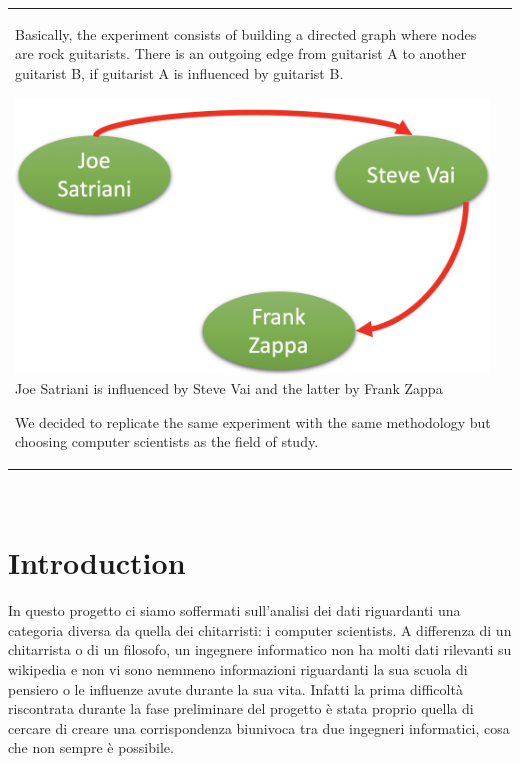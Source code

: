 \documentclass[12pt, twoside]{article}
\begin{document}
\begin{titlepage}
\begin{tabular}{p{6cm} p{10cm}}
Basically, the experiment consists of building a directed graph where nodes are rock guitarists. There is an outgoing edge from guitarist A to another guitarist B, if guitarist A is influenced by guitarist B.
\begin{center}
\includegraphics[scale=0.22]{images/guitar_influences}	
\linebreak
\scriptsize Joe Satriani is influenced by Steve Vai and the latter by Frank Zappa
\end{center}
We decided to replicate the same experiment with the same methodology but choosing computer scientists as the field of study.

\end{tabular}
\end{titlepage}

\tableofcontents
$\ $

\newpage
\section{Introduction}
In questo progetto ci siamo soffermati sull'analisi dei dati riguardanti una categoria diversa da quella dei chitarristi: i computer scientists. A differenza di un chitarrista o di un filosofo, un ingegnere informatico non ha molti dati rilevanti su wikipedia e non vi sono nemmeno informazioni riguardanti la sua scuola di pensiero o le influenze avute durante la sua vita. Infatti la prima difficoltà riscontrata durante la fase preliminare del progetto è stata proprio quella di cercare di creare una corrispondenza biunivoca tra due ingegneri informatici, cosa che non sempre è possibile.
\end{document}
